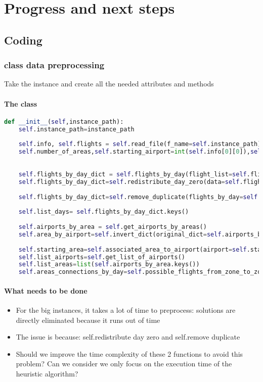 \chapter{Progress and next steps}
\label{Chapter7}

\section{Coding}
\subsection{class data preprocessing}
Take the instance and create all the needed attributes and methods

\subsubsection{The class}
\begin{lstlisting}[language=Python]
def __init__(self,instance_path):
    self.instance_path=instance_path
    
    self.info, self.flights = self.read_file(f_name=self.instance_path)
    self.number_of_areas,self.starting_airport=int(self.info[0][0]),self.info[0][1]
    
    
    self.flights_by_day_dict = self.flights_by_day(flight_list=self.flights)
    self.flights_by_day_dict=self.redistribute_day_zero(data=self.flights_by_day_dict,number_of_days=self.number_of_areas)
    
    self.flights_by_day_dict=self.remove_duplicate(flights_by_day=self.flights_by_day_dict)
    
    self.list_days= self.flights_by_day_dict.keys()
    
    self.airports_by_area = self.get_airports_by_areas()
    self.area_by_airport=self.invert_dict(original_dict=self.airports_by_area)
    
    self.starting_area=self.associated_area_to_airport(airport=self.starting_airport)
    self.list_airports=self.get_list_of_airports()
    self.list_areas=list(self.airports_by_area.keys())
    self.areas_connections_by_day=self.possible_flights_from_zone_to_zone_specific_day()
\end{lstlisting}
\subsubsection{What needs to be done}
\begin{itemize}
    \item For the big instances, it takes a lot of time to preprocess: solutions are directly eliminated because it runs out of time
    \item The issue is because: self.redistribute day zero and self.remove duplicate
    \item Should we improve the time complexity of these 2 functions to avoid this problem? Can we consider we only focus on the execution time of the heuristic algorithm?
\end{itemize}

